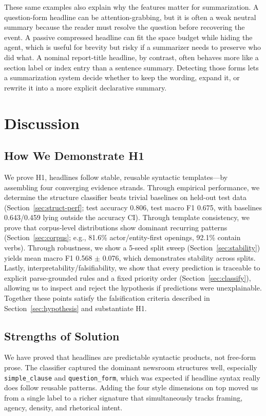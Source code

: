 \documentclass[11pt]{article}
\begin{document}
These same examples also explain why the features matter for summarization. A question-form headline can be attention-grabbing, but it is often a weak neutral summary because the reader must resolve the question before recovering the event. A passive compressed headline can fit the space budget while hiding the agent, which is useful for brevity but risky if a summarizer needs to preserve who did what. A nominal report-title headline, by contrast, often behaves more like a section label or index entry than a sentence summary. Detecting those forms lets a summarization system decide whether to keep the wording, expand it, or rewrite it into a more explicit declarative summary.

\section{Discussion}

\subsection{How We Demonstrate H1}
We prove H1, headlines follow stable, reusable syntactic templates---by assembling four converging evidence strands. Through empirical performance, we determine the structure classifier beats trivial baselines on held-out test data (Section~\ref{sec:struct-perf}; test accuracy 0.806, test macro F1 0.675, with baselines 0.643/0.459 lying outside the accuracy CI). Through template consistency, we prove that corpus-level distributions show dominant recurring patterns (Section~\ref{sec:corpus}; e.g., 81.6\% actor/entity-first openings, 92.1\% contain verbs). Through robustness, we show a 5-seed split sweep (Section~\ref{sec:stability}) yields mean macro F1 0.568 $\pm$ 0.076, which demonstrates stability across splits. Lastly, interpretability/falsifiability, we show that every prediction is traceable to explicit parse-grounded rules and a fixed priority order (Section~\ref{sec:classify}), allowing us to inspect and reject the hypothesis if predictions were unexplainable. Together these points satisfy the falsification criteria described in Section~\ref{sec:hypothesis} and substantiate H1.

\subsection{Strengths of Solution}
We have proved that headlines are predictable syntactic products, not free-form prose. The classifier captured the dominant newsroom structures well, especially \texttt{simple\_clause} and \texttt{question\_form}, which was expected if headline syntax really does follow reusable patterns. Adding the four style dimensions on top moved us from a single label to a richer signature that simultaneously tracks framing, agency, density, and rhetorical intent.
\end{document}
